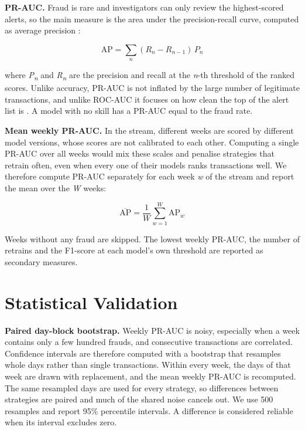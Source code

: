 \textbf{PR-AUC.} Fraud is rare and investigators can only review the highest-scored alerts, so the main measure is the area under the precision-recall curve, computed as average precision \cite{dalpozzolo2018}:

\begin{equation}
  \mathrm{AP} = \sum_{n} (R_n - R_{n-1})\,P_n
  \label{eq:ap}
\end{equation}

where \textit{P\textsubscript{n}} and \textit{R\textsubscript{n}} are the precision and recall at the \textit{n}-th threshold of the ranked scores. Unlike accuracy, PR-AUC is not inflated by the large number of legitimate transactions, and unlike ROC-AUC it focuses on how clean the top of the alert list is \cite{abdelnaby2023}. A model with no skill has a PR-AUC equal to the fraud rate.

\textbf{Mean weekly PR-AUC.} In the stream, different weeks are scored by different model versions, whose scores are not calibrated to each other. Computing a single PR-AUC over all weeks would mix these scales and penalise strategies that retrain often, even when every one of their models ranks transactions well. We therefore compute PR-AUC separately for each week \textit{w} of the stream and report the mean over the \textit{W} weeks:

\begin{equation}
  \overline{\mathrm{AP}} = \frac{1}{W} \sum_{w=1}^{W} \mathrm{AP}_w
  \label{eq:weekly}
\end{equation}

Weeks without any fraud are skipped. The lowest weekly PR-AUC, the number of retrains and the F1-score at each model's own threshold are reported as secondary measures.

\section{Statistical Validation}

\textbf{Paired day-block bootstrap.} Weekly PR-AUC is noisy, especially when a week contains only a few hundred frauds, and consecutive transactions are correlated. Confidence intervals are therefore computed with a bootstrap that resamples whole days rather than single transactions. Within every week, the days of that week are drawn with replacement, and the mean weekly PR-AUC is recomputed. The same resampled days are used for every strategy, so differences between strategies are paired and much of the shared noise cancels out. We use 500 resamples and report 95\% percentile intervals. A difference is considered reliable when its interval excludes zero.

